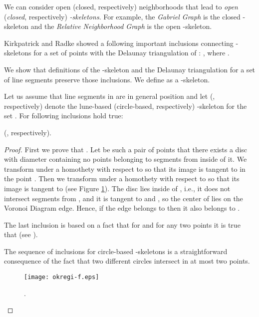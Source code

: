 \documentclass[11pt]{llncs}
\begin{document}
 We can  consider open (closed, respectively) neighborhoods 
that lead to {\em open} ({\em closed}, respectively) {\em -skeletons}. For example, 
the {\em Gabriel Graph}  \cite{gs69} is the closed -skeleton and the
{\em Relative Neighborhood Graph}  \cite{tou80} is the open -skeleton.

Kirkpatrick and Radke \cite{kr85} showed a following important inclusions connecting 
-skeletons for a set of points  with the Delaunay triangulation 
 of  : 
, 
where . 



We show that definitions of the -skeleton and the Delaunay 
triangulation for a set of line segments  preserve those inclusions. 
We define  as a -skeleton.


\begin{theorem}
\label{luneinkluzja}
Let us assume that line segments in  are in general position and let  
(, respectively) denote the lune-based (circle-based, respectively)
-skeleton for the set .
For  following inclusions hold true: 

(, respectively). 
\end{theorem}
\begin{proof} 
First we prove that .
Let  be such a pair of points that there exists a disc  
with diameter  containing no points belonging to segments 
from  inside of it. 
We transform  under a homothety with respect to  so that its image  is 
tangent to  in the point . Then we transform  under a homothety with respect 
to  so that its image  is tangent to  (see Figure \ref{fig:gg-dt}). 
The disc  lies inside of , i.e., it does not intersect segments 
from , and it is tangent to  and  , so the center of  lies on the Voronoi Diagram  edge. Hence, if the edge  belongs to  then it also belongs 
to . 

The last inclusion is based on a fact that for  and for any two points  it is true that  (see \cite{kr85}).






The sequence of inclusions for circle-based -skeletons is a straightforward 
consequence of the fact that two different circles intersect in at most two points.

\begin{figure}[htbp]
\centering
\texttt{[image: okregi-f.eps]}
\caption{.}
\label{fig:gg-dt}
\end{figure}  

\end{proof}
\end{document}
